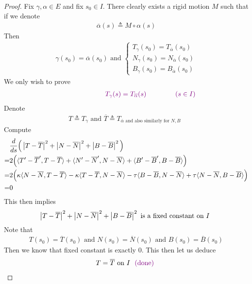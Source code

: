 \documentclass{report}
\begin{document}
\begin{proof}
Fix $\gamma ,\alpha \in E$ and fix $s_0\in I$. There clearly exists a rigid motion $M$ such that if we denote 
\begin{align*}
\overline{\alpha }(s)\triangleq M\circ \alpha (s)
\end{align*}
Then 
\begin{align*}
\gamma (s_0)=\overline{\alpha }(s_0)\text{ and }\begin{cases}
  T_\gamma (s_0)=T_{\overline{\alpha }}(s_0)\\
  N_\gamma (s_0)=N_{\overline{\alpha }}(s_0)\\
  B_\gamma  (s_0)=B_{\overline{\alpha  }}(s_0)
\end{cases}
\end{align*}
We only wish to prove 
\begin{align*}
\textcolor{violet}{\hspace{2.5cm}T_\gamma (s)=T_{\overline{\alpha }}(s)\hspace{1.5cm}(s \in I)}
\end{align*}
Denote 
\begin{align*}
T\triangleq T_\gamma \text{ and }\overline{T}\triangleq T_{\overline{\alpha }\text{ and also similarly for $N,B$ }}
\end{align*}
Compute 
\begin{align*}
&\frac{d}{ds} \Big( \left|T-\overline{T}\right|^2 + \left|N-\overline{N}\right|^2+ \left|B-\overline{B}\right|^2\Big)\\
  =&2\Big( \langle T'-\overline{T}',T-\overline{T}\rangle + \langle N'-\overline{N}' ,N-\overline{N}\rangle + \langle B'-\overline{B}', B-\overline{B}\rangle \Big)\\
  =&2\Big(\kappa \langle N-\overline{N},T-\overline{T}\rangle - \kappa\langle T-\overline{T},N-\overline{N}\rangle -\tau \langle B-\overline{B},N-\overline{N}\rangle + \tau\langle N- \overline{N},B-\overline{B}\rangle  \Big)\\
  =&0 
\end{align*}
This then implies 
\begin{align*}
\left|T-\overline{T}\right|^2 + \left|N-\overline{N}\right|^2 + \left|B-\overline{B}\right|^2 \text{ is a fixed constant on $I$ }
\end{align*}
Note that 
\begin{align*}
T(s_0)=\overline{T}(s_0)\text{ and }N(s_0)=\overline{N}(s_0)\text{ and }B(s_0)=\overline{B}(s_0)
\end{align*}
Then we know that fixed constant is exactly $0$. This then let us deduce
 \begin{align*}
T=\overline{T}\text{ on $I$ }\textcolor{violet}{\text{ (done) }}
\end{align*}









\end{proof}
\end{document}

